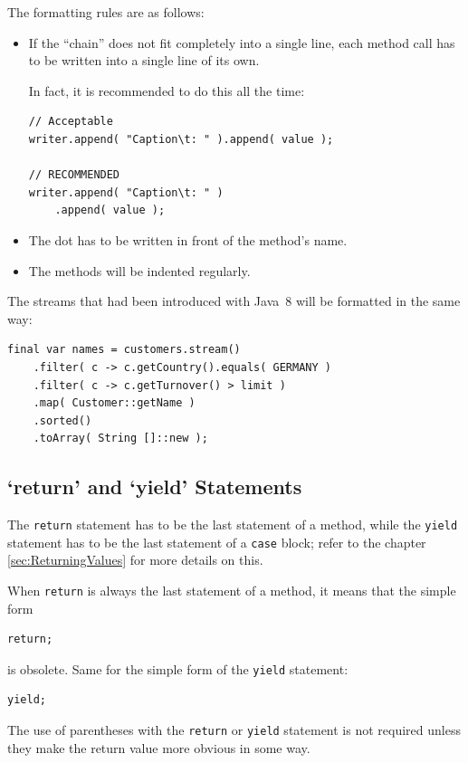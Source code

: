 \documentclass[11pt,a4paper, titlepage, parskip=half, headsepline, footsepline, cleardoublepage=current, headheight=1cm]{scrbook}
\begin{document}
The formatting rules are as follows:
\begin{itemize}
\item{If the “chain” does not fit completely into a single line, each method call has to be written into a single line of its own.

In fact, it is recommended to do this all the time:
\begin{lstlisting}
// Acceptable
writer.append( "Caption\t: " ).append( value );

// RECOMMENDED
writer.append( "Caption\t: " )
    .append( value );
\end{lstlisting}}

\item{The dot has to be written in front of the method's name.}

\item{The methods will be indented regularly.}
\end{itemize}

The streams that had been introduced with Java~8 will be formatted in the same way:
\begin{lstlisting}
final var names = customers.stream()
    .filter( c -> c.getCountry().equals( GERMANY )
    .filter( c -> c.getTurnover() > limit )
    .map( Customer::getName )
    .sorted()
    .toArray( String []::new );
\end{lstlisting}


\subsection{‘return’ and ‘yield’ Statements}
The \lstinline|return| statement has to be the last statement of a method, while the \lstinline|yield| statement has to be the last statement of a \lstinline|case| block; refer to the chapter \ref{sec:ReturningValues} for more details on this.

When \lstinline|return| is always the last statement of a method, it means that the simple form
\begin{lstlisting}
return;
\end{lstlisting}
is obsolete. Same for the simple form of the \lstinline|yield| statement:
\begin{lstlisting}
yield;
\end{lstlisting}

The use of parentheses with the \lstinline|return| or \lstinline|yield| statement is not required unless they make the return value more obvious in some way.
\end{document}
